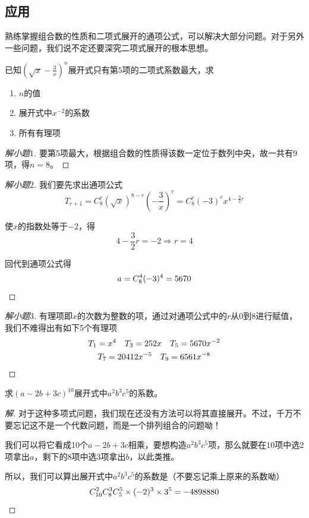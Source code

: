 \subsection{应用}
熟练掌握组合数的性质和二项式展开的通项公式，可以解决大部分问题。对于另外一些问题，我们说不定还要深究二项式展开的根本思想。

\begin{example}
	已知$(\sqrt{x}-\frac{3}{x})^n$展开式只有第$5$项的二项式系数最大，求

	\begin{enumerate}
		\item $n$的值
		\item 展开式中$x^{-2}$的系数
		\item 所有有理项
	\end{enumerate}
\end{example}

\begin{proof}[解小题$1$]
	要第5项最大，根据组合数的性质得该数一定位于数列中央，故一共有9项，得$n=8$。
\end{proof}

\begin{proof}[解小题$2$]
	我们要先求出通项公式\[T_{r+1}=C_8^r(\sqrt{x})^{8-r}(-\frac{3}{x})^r=C_8^r(-3)^rx^{4-\frac{3}{2}r}\]

	使$x$的指数处等于$-2$，得\[4-\frac{3}{2}r=-2\Rightarrow r=4\]

	回代到通项公式得\[a=C_8^4(-3)^4=5670\qedhere\]
\end{proof}

\begin{proof}[解小题$3$]
	有理项即$x$的次数为整数的项，通过对通项公式中的$r$从0到8进行赋值，我们不难得出有如下5个有理项
	\begin{gather*}
		T_1=x^4\quad T_3=252x\quad T_5=5670x^{-2} \\
		T_7=20412x^{-5}\quad T_9=6561x^{-8} \qedhere
	\end{gather*}
\end{proof}

\begin{example}
	求$(a-2b+3c)^{10}$展开式中$a^2b^3c^5$的系数。
\end{example}

\begin{proof}[解]
	对于这种多项式问题，我们现在还没有方法可以将其直接展开。不过，千万不要忘记这不是一个代数问题，而是一个排列组合的问题呦！

	我们可以将它看成10个$a-2b+3c$相乘，要想构造$a^2b^3c^5$项，那么就要在10项中选2项拿出$a$，剩下的8项中选3项拿出$b$，以此类推。

	所以，我们可以算出展开式中$a^2b^3c^5$的系数是（不要忘记乘上原来的系数呦）\[C_{10}^2C_8^3C_5^5\times(-2)^3\times3^5=-4898880 \qedhere\]
\end{proof}

